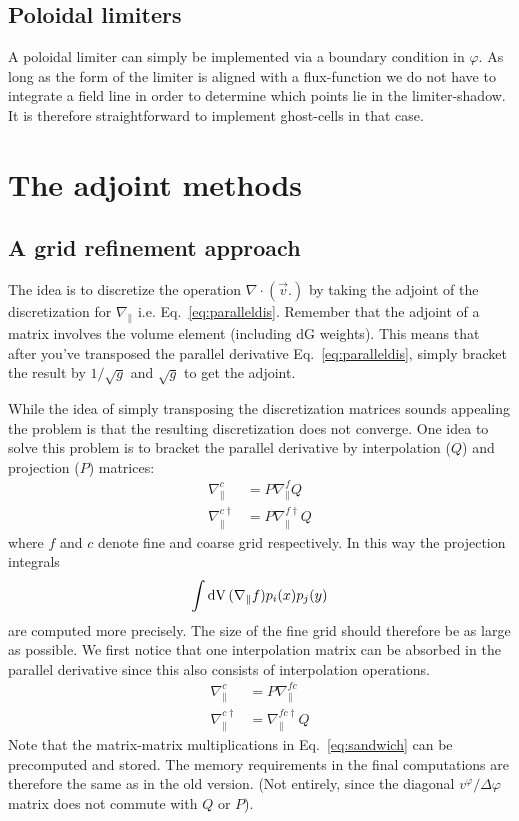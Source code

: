 \subsection{Poloidal limiters}
A poloidal limiter can simply be implemented via a boundary condition in $\varphi$.
As long as the form of the limiter is aligned with a flux-function we do not have to
integrate a field line in order to determine which points lie in the
limiter-shadow. It is therefore straightforward to implement ghost-cells
in that case.


\section{The adjoint methods}
\subsection{A grid refinement approach}
The idea is to discretize the operation $\nabla\cdot( \vec v .)$ by
taking the adjoint of the discretization for $\nabla_\parallel$ i.e. Eq.~\eqref{eq:paralleldis}.
Remember that the adjoint of a matrix
involves the volume element (including dG weights). This means that after you've transposed the
parallel derivative Eq.~\eqref{eq:paralleldis}, simply bracket the result
by $1/\sqrt{g}$ and $\sqrt{g}$ to get the adjoint.

While the idea of simply transposing the discretization matrices sounds appealing the problem
is that the resulting discretization does not converge.
One idea to solve this problem \cite{Stegmeir2017} is
to bracket the parallel derivative by interpolation ($Q$) and
projection ($P$) matrices:
\begin{align}
    \nabla^c_\parallel &= P\nabla_\parallel^f Q \\
    \nabla^{c\dagger}_\parallel &= P \nabla^{f\dagger}_\parallel Q
    \label{eq:sandwich}
\end{align}
where $f$ and $c$ denote fine and coarse grid respectively.
In this way the projection integrals
\begin{align*}
    \int\mathrm{dV}\, (\nabla_\parallel f) p_i(x)p_j(y)
    \label{}
\end{align*}
are computed more precisely.
The size of the fine grid should therefore be as large as
possible.
We first notice that one interpolation matrix can be absorbed
in the parallel derivative since this also consists of
interpolation operations.
\begin{align}
    \nabla^c_\parallel &= P\nabla_\parallel^{fc} \\
    \nabla^{c\dagger}_\parallel &= \nabla^{fc\dagger}_\parallel Q
    \label{eq:sandwich}
\end{align}
Note that the matrix-matrix multiplications in Eq.~\eqref{eq:sandwich} can
be precomputed and stored. The memory requirements
in the final computations are
therefore the same  as in the old version. (Not entirely, since
the diagonal $v^\varphi/\Delta \varphi$ matrix does not commute with $Q$ or $P$).



